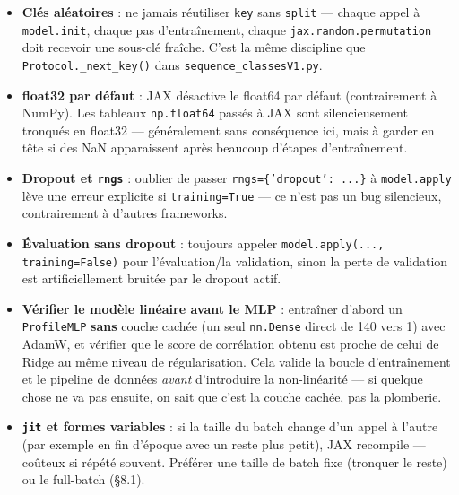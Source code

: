 \documentclass[11pt,a4paper]{article}
\begin{document}
\begin{itemize}
    \item \textbf{Clés aléatoires} : ne jamais réutiliser \texttt{key} sans
          \texttt{split} --- chaque appel à \texttt{model.init}, chaque pas
          d'entraînement, chaque \texttt{jax.random.permutation} doit recevoir
          une sous-clé fraîche. C'est la même discipline que
          \texttt{Protocol.\_next\_key()} dans \texttt{sequence\_classesV1.py}.
    \item \textbf{float32 par défaut} : JAX désactive le float64 par défaut
          (contrairement à NumPy). Les tableaux \texttt{np.float64} passés à
          JAX sont silencieusement tronqués en float32 --- généralement sans
          conséquence ici, mais à garder en tête si des NaN apparaissent après
          beaucoup d'étapes d'entraînement.
    \item \textbf{Dropout et \texttt{rngs}} : oublier de passer
          \texttt{rngs=\{'dropout': ...\}} à \texttt{model.apply} lève une
          erreur explicite si \texttt{training=True} --- ce n'est pas un bug
          silencieux, contrairement à d'autres frameworks.
    \item \textbf{Évaluation sans dropout} : toujours appeler
          \texttt{model.apply(..., training=False)} pour l'évaluation/la
          validation, sinon la perte de validation est artificiellement
          bruitée par le dropout actif.
    \item \textbf{Vérifier le modèle linéaire avant le MLP} : entraîner
          d'abord un \texttt{ProfileMLP} \textbf{sans} couche cachée (un seul
          \texttt{nn.Dense} direct de 140 vers 1) avec AdamW, et vérifier que
          le score de corrélation obtenu est proche de celui de Ridge au même
          niveau de régularisation. Cela valide la boucle d'entraînement et le
          pipeline de données \emph{avant} d'introduire la non-linéarité --- si
          quelque chose ne va pas ensuite, on sait que c'est la couche cachée,
          pas la plomberie.
    \item \textbf{\texttt{jit} et formes variables} : si la taille du batch
          change d'un appel à l'autre (par exemple en fin d'époque avec un
          reste plus petit), JAX recompile --- coûteux si répété souvent.
          Préférer une taille de batch fixe (tronquer le reste) ou le
          full-batch (\S 8.1).
\end{itemize}

\end{document}
